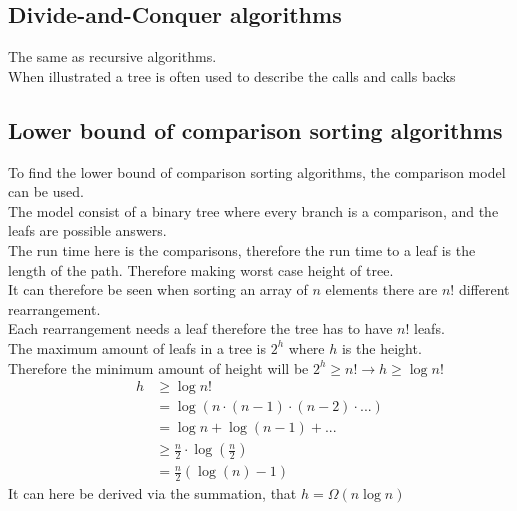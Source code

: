 \documentclass[12pt, a4paper]{article}
\begin{document}
			\subsection{Divide-and-Conquer algorithms}
				The same as recursive algorithms.\\
				When illustrated a tree is often used to describe the calls and calls backs
			\subsection{Lower bound of comparison sorting algorithms}
				To find the lower bound of comparison sorting algorithms, the comparison model can be used.\\
				The model consist of a binary tree where every branch is a comparison, and the leafs are possible answers.\\
				The run time here is the comparisons, therefore the run time to a leaf is the length of the path. Therefore making worst case height of tree.\\
				It can therefore be seen when sorting an array of $n$ elements there are $n!$  different rearrangement.\\
				Each rearrangement needs a leaf therefore the tree has to have $n!$ leafs.\\
				The maximum amount of leafs in a tree is $2^h$ where $h$ is the height.\\
				Therefore the minimum amount of height will be $2^h\geq n! \rightarrow h\geq \log n!$\\
				\begin{align*}
					h&\geq \log n!\\
					&=\log (n\cdot (n-1)\cdot (n-2)\cdot ...)\\
					&=\log n + \log(n-1) + ...\\
					&\geq \frac{n}{2}\cdot \log(\frac{n}{2})\\
					&=\frac{n}{2}(\log(n)-1)
				\end{align*}		
				It can here be derived via the summation, that $h=\Omega(n\log n)$
\end{document}
